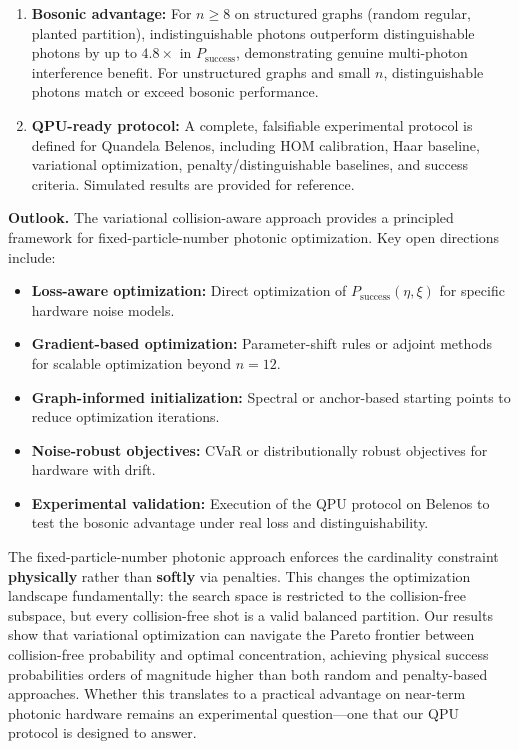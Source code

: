 \begin{enumerate}
\item \textbf{Bosonic advantage:} For $n\ge 8$ on structured graphs (random regular, planted partition), indistinguishable photons outperform distinguishable photons by up to $4.8\times$ in $P_{\mathrm{success}}$, demonstrating genuine multi-photon interference benefit. For unstructured graphs and small $n$, distinguishable photons match or exceed bosonic performance.

\item \textbf{QPU-ready protocol:} A complete, falsifiable experimental protocol is defined for Quandela Belenos, including HOM calibration, Haar baseline, variational optimization, penalty/distinguishable baselines, and success criteria. Simulated results are provided for reference.
\end{enumerate}

\textbf{Outlook.} The variational collision-aware approach provides a principled framework for fixed-particle-number photonic optimization. Key open directions include:
\begin{itemize}
\item \textbf{Loss-aware optimization:} Direct optimization of $P_{\mathrm{success}}(\eta,\xi)$ for specific hardware noise models.
\item \textbf{Gradient-based optimization:} Parameter-shift rules or adjoint methods for scalable optimization beyond $n=12$.
\item \textbf{Graph-informed initialization:} Spectral or anchor-based starting points to reduce optimization iterations.
\item \textbf{Noise-robust objectives:} CVaR or distributionally robust objectives for hardware with drift.
\item \textbf{Experimental validation:} Execution of the QPU protocol on Belenos to test the bosonic advantage under real loss and distinguishability.
\end{itemize}

The fixed-particle-number photonic approach enforces the cardinality constraint \textbf{physically} rather than \textbf{softly} via penalties. This changes the optimization landscape fundamentally: the search space is restricted to the collision-free subspace, but every collision-free shot is a valid balanced partition. Our results show that variational optimization can navigate the Pareto frontier between collision-free probability and optimal concentration, achieving physical success probabilities orders of magnitude higher than both random and penalty-based approaches. Whether this translates to a practical advantage on near-term photonic hardware remains an experimental question---one that our QPU protocol is designed to answer.
